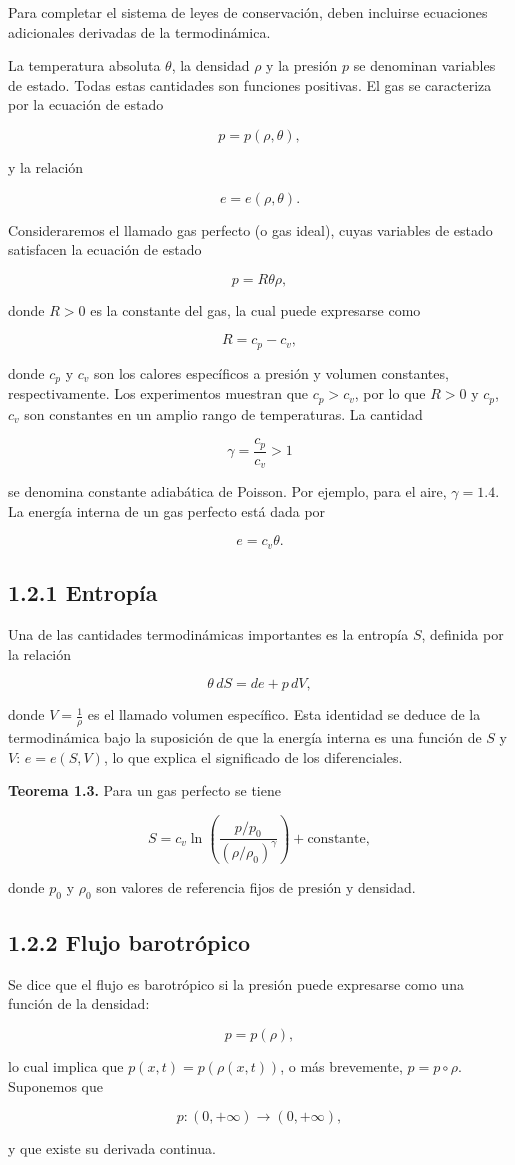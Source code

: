 \documentclass[12pt]{article}
\begin{document}
Para completar el sistema de leyes de conservación, deben incluirse ecuaciones adicionales derivadas de la termodinámica.

La temperatura absoluta $\theta$, la densidad $\rho$ y la presión $p$ se denominan variables de estado. Todas estas cantidades son funciones positivas. El gas se caracteriza por la ecuación de estado

\[
p = p(\rho, \theta),
\]

y la relación

\[
e = e(\rho, \theta).
\]

Consideraremos el llamado gas perfecto (o gas ideal), cuyas variables de estado satisfacen la ecuación de estado

\[
p = R \theta \rho,
\]

donde $R > 0$ es la constante del gas, la cual puede expresarse como

\[
R = c_p - c_v,
\]

donde $c_p$ y $c_v$ son los calores específicos a presión y volumen constantes, respectivamente. Los experimentos muestran que $c_p > c_v$, por lo que $R > 0$ y $c_p$, $c_v$ son constantes en un amplio rango de temperaturas. La cantidad

\[
\gamma = \frac{c_p}{c_v} > 1
\]

se denomina constante adiabática de Poisson. Por ejemplo, para el aire, $\gamma = 1.4$. La energía interna de un gas perfecto está dada por

\[
e = c_v \theta.
\]

\subsection*{1.2.1 Entropía}

Una de las cantidades termodinámicas importantes es la entropía $S$, definida por la relación

\[
\theta \, dS = de + p \, dV,
\]

donde $V = \frac{1}{\rho}$ es el llamado volumen específico. Esta identidad se deduce de la termodinámica bajo la suposición de que la energía interna es una función de $S$ y $V$: $e = e(S, V)$, lo que explica el significado de los diferenciales.

\textbf{Teorema 1.3.} Para un gas perfecto se tiene

\[
S = c_v \ln \left( \frac{p/p_0}{(\rho/\rho_0)^\gamma} \right) + \text{constante},
\]

donde $p_0$ y $\rho_0$ son valores de referencia fijos de presión y densidad.

\subsection*{1.2.2 Flujo barotrópico}

Se dice que el flujo es barotrópico si la presión puede expresarse como una función de la densidad:

\[
p = p(\rho),
\]

lo cual implica que $p(x,t) = p(\rho(x,t))$, o más brevemente, $p = p \circ \rho$. Suponemos que

\[
p : (0, +\infty) \to (0, +\infty),
\]

y que existe su derivada continua.
\end{document}

